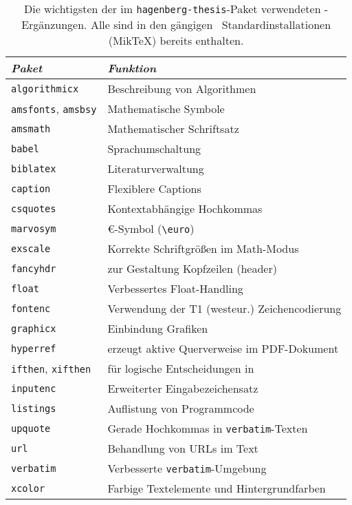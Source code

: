 \begin{table}
    \caption{Die wichtigsten der im \texttt{hagenberg-thesis}-Paket
    verwendeten \latex-Ergänzungen. Alle sind in den gängigen \latex\
    Standardinstallationen (\zB MikTeX) bereits enthalten.}
    \label{tab:packages}
    \centering\small
    \begin{tabular}{@{}ll@{}}
        \toprule
        \emph{Paket}          & \emph{Funktion} \\
        \midrule
        \texttt{algorithmicx} & Beschreibung von Algorithmen \\
        \texttt{amsfonts},
        \texttt{amsbsy}       & Mathematische Symbole \\
        \texttt{amsmath}      & Mathematischer Schriftsatz \\
        \texttt{babel}        & Sprachumschaltung \\
        \texttt{biblatex}     & Literaturverwaltung \\
        \texttt{caption}      & Flexiblere Captions \\
        \texttt{csquotes}     & Kontextabhängige Hochkommas \\
        \texttt{marvosym}      & {\euro}-Symbol (\verb!\euro!) \\
        \texttt{exscale}      & Korrekte Schriftgrößen im Math-Modus \\
        \texttt{fancyhdr}     & zur Gestaltung Kopfzeilen (header) \\
        \texttt{float}        & Verbessertes Float-Handling \\
        \texttt{fontenc}      & Verwendung der T1 (westeur.) Zeichencodierung \\
        \texttt{graphicx}     & Einbindung Grafiken \\
        \texttt{hyperref}     & erzeugt aktive Querverweise im PDF-Dokument \\
        \texttt{ifthen},
        \texttt{xifthen}      & für logische Entscheidungen in \latex \\
        \texttt{inputenc}     & Erweiterter Eingabezeichensatz \\
        \texttt{listings}     & Auflistung von Programmcode \\
        \texttt{upquote}      & Gerade Hochkommas in \texttt{verbatim}-Texten \\
        \texttt{url}          & Behandlung von URLs im Text \\
        \texttt{verbatim}     & Verbesserte \texttt{verbatim}-Umgebung \\
        \texttt{xcolor}       & Farbige Textelemente und Hintergrundfarben \\
        \bottomrule
    \end{tabular}
\end{table}


